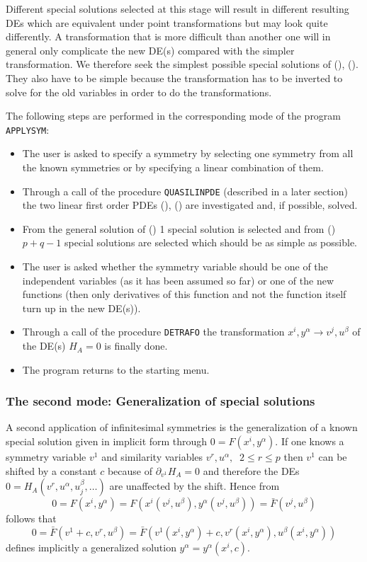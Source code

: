Different special solutions selected at this stage
will result in different
resulting DEs which are equivalent under point transformations but may
look quite differently. A transformation that is more difficult than another
one will in general
only complicate the new DE(s) compared with the simpler transformation.
We therefore seek the simplest possible special
solutions of (), (). They also
have to be simple because the transformation has to be inverted to solve for
the old variables in order to do the transformations.

The following steps are performed in the corresponding mode of the
program \texttt{APPLYSYM}:
\begin{itemize}
\item The user is asked to specify a symmetry by selecting one symmetry
from all the known symmetries or by specifying a linear combination of them.
\item Through a call of the procedure \texttt{QUASILINPDE} (described in a later
section) the two linear first order PDEs (), () are
investigated and, if possible, solved.
\item From the general solution of () 1 special solution
is selected and from () $p+q-1$ special
solutions are selected which should be as simple as possible.
\item The user is asked whether the symmetry variable should be one of the
independent variables (as it has been assumed so far) or one of the new
functions (then only derivatives of this function and not the function itself
turn up in the new DE(s)).
\item Through a call of the procedure \texttt{DETRAFO} the transformation
$x^i,y^\alpha \rightarrow v^j,u^\beta$ of the DE(s) $H_A=0$ is finally done.
\item The program returns to the starting menu.
\end{itemize}
\subsubsection{The second mode: Generalization of special solutions}
A second application of infinitesimal symmetries is the generalization
of a known special solution given in implicit form through
$0 = F(x^i,y^\alpha)$. If one knows a symmetry variable $v^1$ and
similarity variables $v^r, u^\alpha,\;\;2\leq r\leq p$ then
$v^1$ can be shifted by a constant $c$ because of
$\partial_{v^1}H_A = 0$ and
therefore the DEs $0 = H_A(v^r,u^\alpha,u^\beta_j,\ldots)$
are unaffected by the shift. Hence from
\[0 = F(x^i, y^\alpha) = F(x^i(v^j,u^\beta), y^\alpha(v^j,u^\beta)) =
\bar{F}(v^j,u^\beta)\] follows that
\[ 0 = \bar{F}(v^1+c,v^r,u^\beta) =
\bar{F}(v^1(x^i,y^\alpha)+c, v^r(x^i,y^\alpha), u^\beta(x^i,y^\alpha))\]
defines implicitly a generalized solution $y^\alpha=y^\alpha(x^i,c)$.

